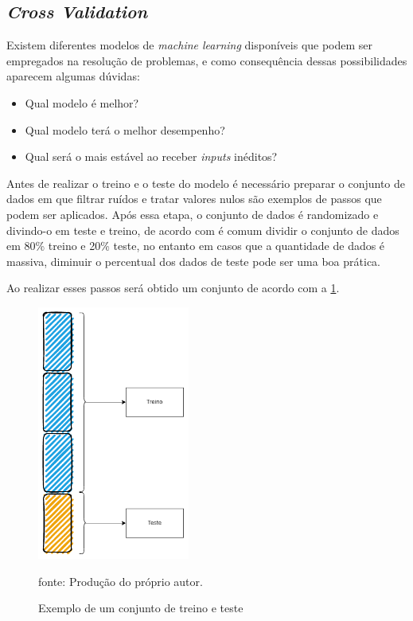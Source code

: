 \documentclass[
  12pt,		%
  a4paper,	%
  openright,%
  oneside,	%
  chapter=TITLE,		%
  section=TITLE,		%
  english,	%
  french,	%
  spanish,	%
  brazil	%
]{abntex2}
\begin{document}
    \subsection{\textit{Cross Validation}}
    Existem diferentes modelos de \textit{machine learning} disponíveis que podem ser empregados na resolução de problemas, 
    e como consequência dessas possibilidades aparecem algumas dúvidas:

    \begin{itemize}
        \item Qual modelo é melhor?
        \item Qual modelo terá o melhor desempenho?
        \item Qual será o mais estável ao receber \textit{inputs} inéditos?
    \end{itemize}

    Antes de realizar o treino e o teste do modelo é necessário preparar o conjunto de dados em que filtrar ruídos e tratar valores
    nulos são exemplos de passos que podem ser aplicados. Após essa etapa, o conjunto de dados é randomizado
    e divindo-o em teste e treino, de acordo com \cite[]{hands_on_ml} é comum dividir o conjunto de dados em 80\% treino
    e 20\% teste, no entanto em casos que a quantidade de dados é massiva, diminuir o percentual dos dados de teste pode ser
    uma boa prática.

    Ao realizar esses passos será obtido um conjunto de acordo com a \ref*{exemplo_treino_teste}.

    \begin{figure}[ht]
        \centering
        \caption{Exemplo de um conjunto de treino e teste}
        \includegraphics[width=5cm]{../reports/figures/treino_teste_exemplo.png}
        \label{exemplo_treino_teste}
        \par
        {\small fonte: Produção do próprio autor.}
    \end{figure}
\end{document}
